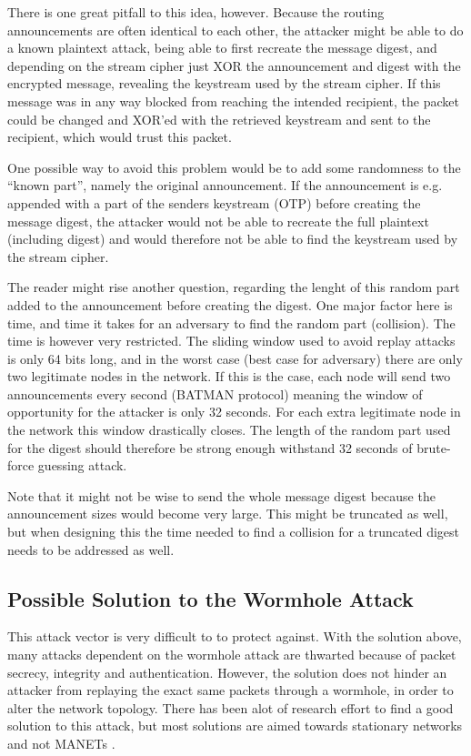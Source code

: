There is one great pitfall to this idea, however. Because the routing
announcements are often identical to each other, the attacker might be able to
do a known plaintext attack, being able to first recreate the message digest,
and depending on the stream cipher just XOR the announcement and digest with the
encrypted message, revealing the keystream used by the stream cipher. If this
message was in any way blocked from reaching the intended recipient, the packet
could be changed and XOR'ed with the retrieved keystream and sent to the
recipient, which would trust this packet.

One possible way to avoid this problem would be to add some randomness to the
``known part'', namely the original announcement. If the announcement is e.g.
appended with a part of the senders keystream (\ac{OTP}) before creating the
message digest, the attacker would not be able to recreate the full plaintext
(including digest) and would therefore not be able to find the keystream used by
the stream cipher.

The reader might rise another question, regarding the lenght of this random part
added to the announcement before creating the digest. One major factor here is
time, and time it takes for an adversary to find the random part (collision).
The time is however very restricted. The sliding window used to avoid replay
attacks is only 64 bits long, and in the worst case (best case for adversary)
there are only two legitimate nodes in the network. If this is the case, each
node will send two announcements every second (BATMAN protocol) meaning the
window of opportunity for the attacker is only 32 seconds. For each extra
legitimate node in the network this window drastically closes. The length of the
random part used for the digest should therefore be strong enough withstand 32
seconds of brute-force guessing attack.

Note that it might not be wise to send the whole message digest because the
announcement sizes would become very large. This might be truncated as well, but
when designing this the time needed to find a collision for a truncated digest
needs to be addressed as well.

\subsection{Possible Solution to the Wormhole Attack}
This attack vector is very difficult to to protect against. With the solution
above, many attacks dependent on the wormhole attack are thwarted because of
packet secrecy, integrity and authentication. However, the solution does not
hinder an attacker from replaying the exact same packets through a wormhole, in
order to alter the network topology. There has been alot of research effort to
find a good solution to this attack, but most solutions are aimed towards
stationary networks and not \acp{MANET} \cite{raoteapproaches}.

